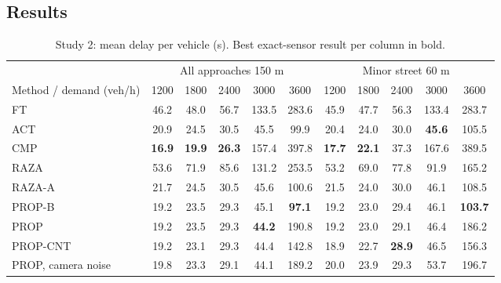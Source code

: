 \documentclass[journal]{IEEEtran}
\newcommand{\best}[1]{\textbf{#1}}
\begin{document}
\subsection{Results}
\begin{table}[t]
\caption{Study 2: mean delay per vehicle (s). Best exact-sensor result per column in bold.}
\label{tab:delay}
\centering
\begin{tabular}{lcccccccccc}
\toprule
 & \multicolumn{5}{c}{All approaches 150 m} & \multicolumn{5}{c}{Minor street 60 m}\\
\cmidrule(lr){2-6}\cmidrule(lr){7-11}
Method / demand (veh/h) & 1200 & 1800 & 2400 & 3000 & 3600 & 1200 & 1800 & 2400 & 3000 & 3600\\
\midrule
FT & 46.2 & 48.0 & 56.7 & 133.5 & 283.6 & 45.9 & 47.7 & 56.3 & 133.4 & 283.7\\
ACT & 20.9 & 24.5 & 30.5 & 45.5 & 99.9 & 20.4 & 24.0 & 30.0 & \best{45.6} & 105.5\\
CMP~\cite{gregoire2015} & \best{16.9} & \best{19.9} & \best{26.3} & 157.4 & 397.8 & \best{17.7} & \best{22.1} & 37.3 & 167.6 & 389.5\\
RAZA~\cite{raza2025} & 53.6 & 71.9 & 85.6 & 131.2 & 253.5 & 53.2 & 69.0 & 77.8 & 91.9 & 165.2\\
RAZA-A & 21.7 & 24.5 & 30.5 & 45.6 & 100.6 & 21.5 & 24.0 & 30.0 & 46.1 & 108.5\\
PROP-B & 19.2 & 23.5 & 29.3 & 45.1 & \best{97.1} & 19.2 & 23.0 & 29.4 & 46.1 & \best{103.7}\\
PROP & 19.2 & 23.5 & 29.3 & \best{44.2} & 190.8 & 19.2 & 23.0 & 29.1 & 46.4 & 186.2\\
PROP-CNT & 19.2 & 23.1 & 29.3 & 44.4 & 142.8 & 18.9 & 22.7 & \best{28.9} & 46.5 & 156.3\\
\midrule
PROP, camera noise & 19.8 & 23.3 & 29.1 & 44.1 & 189.2 & 20.0 & 23.9 & 29.3 & 53.7 & 196.7\\
\bottomrule
\end{tabular}
\end{table}
\end{document}
